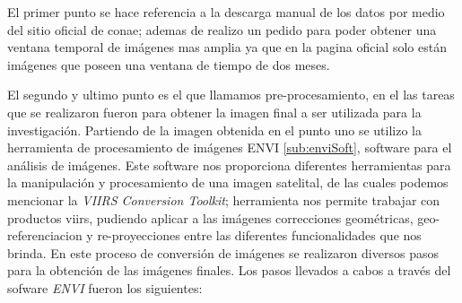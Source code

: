 El primer punto se hace referencia a la descarga manual de los datos por medio del sitio oficial de \ac{conae}; ademas de realizo un pedido para poder obtener una ventana temporal de imágenes mas amplia ya que en la pagina oficial solo están imágenes que poseen una ventana de tiempo de dos meses.

El segundo y ultimo punto es el que llamamos pre-procesamiento, en el las tareas que se realizaron fueron para obtener la imagen final a ser utilizada para la investigación.
Partiendo de la imagen obtenida en el punto uno se utilizo la herramienta de procesamiento de imágenes ENVI \ref{sub:enviSoft}, software para el análisis de imágenes. Este software nos proporciona diferentes herramientas para la manipulación y procesamiento  de  una imagen satelital, de las cuales podemos mencionar la \textit{VIIRS Conversion Toolkit}; herramienta nos permite trabajar con productos \ac{viirs}, pudiendo aplicar a las imágenes correcciones geométricas, geo-referenciacion y re-proyecciones entre las diferentes funcionalidades que nos brinda. En este proceso de conversión de imágenes se realizaron diversos pasos para la obtención de las imágenes finales. Los pasos llevados a cabos a través del sofware \textit{ENVI} fueron los siguientes:

